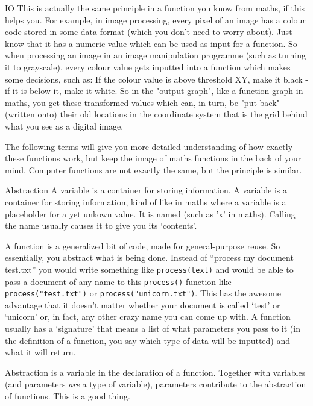 \documentclass[10pt,a4paper]{article}
\begin{document}
\begin{multicols}{3}
\begin{textbox}{IO}
This is actually the same principle in a function you know from maths, if this helps you. For example, in image processing, every pixel of an image has a colour code stored in some data format (which you don't need to worry about). Just know that it has a numeric value which can be used as input for a function. So when processing an image in an image manipulation programme (such as turning it to grayscale), every colour value gets inputted into a function which makes some decisions, such as: If the colour value is above threshold XY, make it black - if it is below it, make it white. So in the "output graph", like a function graph in maths, you get these transformed values which can, in turn, be "put back" (written onto) their old locations in the coordinate system that is the grid behind what you see as a digital image.

The following terms will give you more detailed understanding of how exactly these functions work, but keep the image of maths functions in the back of your mind. Computer functions are not exactly the same, but the principle is similar.
\end{textbox}

\begin{textbox}{Abstraction}
 A variable is a container for storing information. A variable is a container for storing information, kind of like in maths where a variable is a placeholder for a yet unkown value. It is named (such as 'x' in maths). Calling the name usually causes it to give you its `contents'.

 A function is a generalized bit of code, made for general-purpose reuse. So essentially, you abstract what is being done. Instead of ``process my document test.txt'' you would write something like \texttt{process(text)} and would be able to pass a document of any name to this \texttt{process()} function like \texttt{process("test.txt")} or \texttt{process("unicorn.txt")}. This has the awesome advantage that it doesn't matter whether your document is called `test' or `unicorn' or, in fact, any other crazy name you can come up with. A function usually has a `signature' that means a list of what parameters you pass to it (in the definition of a function, you say which type of data will be inputted) and what it will return. 
\end{textbox}

\begin{textbox}{Abstraction}
 is a variable in the declaration of a function. Together with variables (and parameters \emph{are} a type of variable), parameters contribute to the abstraction of functions. This is a good thing. 


\end{textbox}
\end{multicols}
\end{document}
